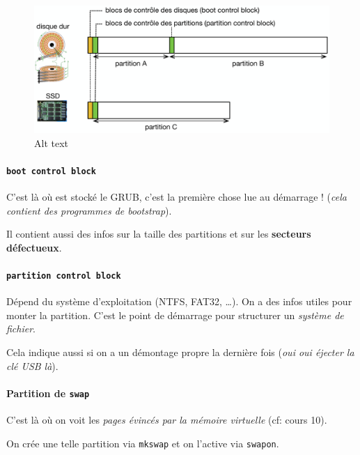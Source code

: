 \begin{figure}
\centering
\includegraphics{image-39.png}
\caption{Alt text}
\end{figure}

\paragraph{\texorpdfstring{\texttt{boot\ control\ block}}{boot control block}}\label{boot-control-block}

C'est là où est stocké le GRUB, c'est la première chose lue au démarrage
! (\emph{cela contient des programmes de bootstrap}).

Il contient aussi des infos sur la taille des partitions et sur les
\textbf{secteurs défectueux}.

\paragraph{\texorpdfstring{\texttt{partition\ control\ block}}{partition control block}}\label{partition-control-block}

Dépend du système d'exploitation (NTFS, FAT32, \ldots). On a des infos
utiles pour monter la partition. C'est le point de démarrage pour
structurer un \emph{système de fichier}.

Cela indique aussi si on a un démontage propre la dernière fois
(\emph{oui oui éjecter la clé USB là}).

\paragraph{\texorpdfstring{Partition de
\texttt{swap}}{Partition de swap}}\label{partition-de-swap}

C'est là où on voit les \emph{pages évincés par la mémoire virtuelle}
(cf: cours 10).

On crée une telle partition via \texttt{mkswap} et on l'active via
\texttt{swapon}.

